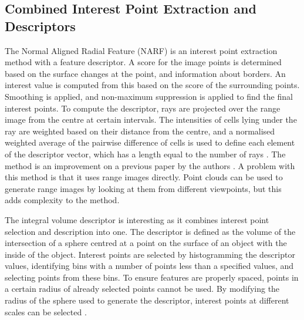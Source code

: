 \documentclass[10pt,a4paper]{article}
\begin{document}
\subsection{Combined Interest Point Extraction and Descriptors}
The Normal Aligned Radial Feature (NARF) is an interest point extraction method
with a feature descriptor. A score for the image points is determined based on
the surface changes at the point, and information about borders. An interest
value is computed from this based on the score of the surrounding points.
Smoothing is applied, and non-maximum suppression is applied to find the final
interest points. To compute the descriptor, rays are projected over the range
image from the centre at certain intervals. The intensities of cells lying under
the ray are weighted based on their distance from the centre, and a normalised
weighted average of the pairwise difference of cells is used to define each
element of the descriptor vector, which has a length equal to the number of rays
\cite{steder2011point}. The method is an improvement on a previous paper by the
authors \cite{steder2009robust}. A problem with this method is that it uses
range images directly. Point clouds can be used to generate range images by
looking at them from different viewpoints, but this adds complexity to the
method.

The integral volume descriptor is interesting as it combines interest point
selection and description into one. The descriptor is defined as the volume of
the intersection of a sphere centred at a point on the surface of an object with
the inside of the object. Interest points are selected by histogramming the
descriptor values, identifying bins with a number of points less than a
specified values, and selecting points from these bins. To ensure features are
properly spaced, points in a certain radius of already selected points cannot be
used. By modifying the radius of the sphere used to generate the descriptor,
interest points at different scales can be selected \cite{gelfand2005robust}.

\end{document}
